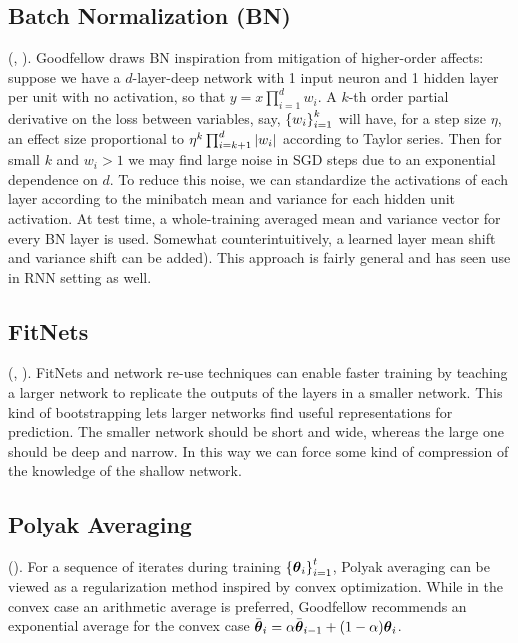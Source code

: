 \documentclass{article}
\begin{document}
\subsection{Batch Normalization (BN)}

(, ). Goodfellow draws BN inspiration from mitigation of higher-order affects: suppose we have a $d$-layer-deep network with 1 input neuron and 1 hidden layer per unit with no activation, so that $y=x\prod_{i=1}^dw_i$. A $k$-th order partial derivative on the loss between variables, say, $\left\{{w_i}\right\}_{i=1}^k$ will have, for a step size $\eta$, an effect size proportional to $\eta^k\prod_{i=k + 1}^{d}\left|{w_i}\right|$ according to Taylor series. Then for small $k$ and $w_i>1$ we may find large noise in SGD steps due to an exponential dependence on $d$. To reduce this noise, we can standardize the activations of each layer according to the minibatch mean and variance for each hidden unit activation. At test time, a whole-training averaged mean and variance vector for every BN layer is used. Somewhat counterintuitively, a learned layer mean shift and variance shift can be added). This approach is fairly general and has seen use in RNN setting as well.

\subsection{FitNets}

(, ). FitNets and network re-use techniques can enable faster training by teaching a larger network to replicate the outputs of the layers in a smaller network. This kind of bootstrapping lets larger networks find useful representations for prediction. The smaller network should be short and wide, whereas the large one should be deep and narrow. In this way we can force some kind of compression of the knowledge of the shallow network.

\subsection{Polyak Averaging}

(). For a sequence of iterates during training $\left\{{{\boldsymbol\theta}_i}\right\}_{i=1}^t$, Polyak averaging can be viewed as a regularization method inspired by convex optimization. While in the convex case an arithmetic average is preferred, Goodfellow recommends an exponential average for the convex case $\bar{{\boldsymbol\theta}}_i=\alpha \bar{{\boldsymbol\theta}}_{i-1}+(1-\alpha){\boldsymbol\theta}_{i}$.
\end{document}

